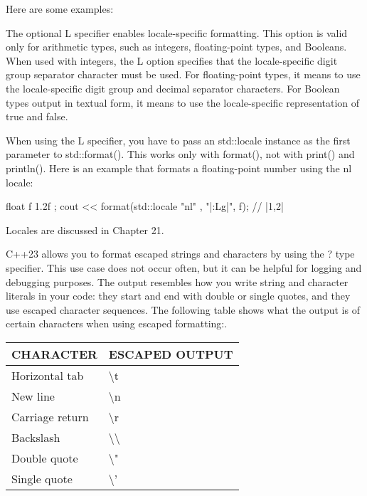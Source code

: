 Here are some examples:



The optional L specifier enables locale-specific formatting. This option is valid only for arithmetic types, such as integers, floating-point types, and Booleans. When used with integers, the L option specifies that the locale-specific digit group separator character must be used. For floating-point types, it means to use the locale-specific digit group and decimal separator characters. For Boolean types output in textual form, it means to use the locale-specific representation of true and false.

When using the L specifier, you have to pass an std::locale instance as the first parameter to std::format(). This works only with format(), not with print() and println(). Here is an example that formats a floating-point number using the nl locale:

\begin{cpp}
float f { 1.2f };
cout << format(std::locale{ "nl" }, "|{:Lg}|\n", f); // |1,2|
\end{cpp}

Locales are discussed in Chapter 21.



C++23 allows you to format escaped strings and characters by using the ? type specifier. This use case does not occur often, but it can be helpful for logging and debugging purposes. The output resembles how you write string and character literals in your code: they start and end with double or single quotes, and they use escaped character sequences. The following table shows what the output is of certain characters when using escaped formatting:.

\begin{longtable}{|l|l|}
\hline
CHARACTER       & ESCAPED OUTPUT                   \\ \hline
\endfirsthead
%
\endhead
%
Horizontal tab  & \textbackslash{}t                \\ \hline
New line        & \textbackslash{}n                \\ \hline
Carriage return & \textbackslash{}r                \\ \hline
Backslash       & \textbackslash{}\textbackslash{} \\ \hline
Double quote    & \textbackslash{}"                \\ \hline
Single quote    & \textbackslash{}'                \\ \hline
\end{longtable}

